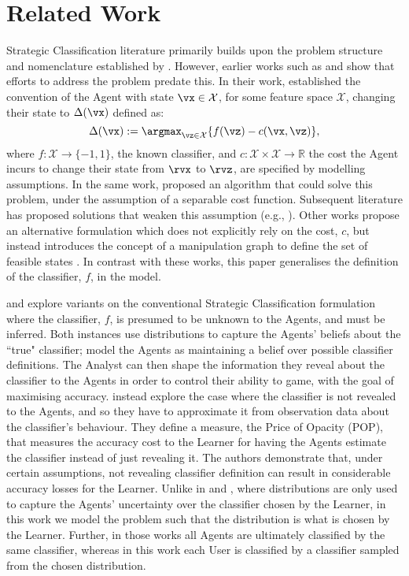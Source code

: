 \section{Related Work}
\label{related_work}
Strategic Classification literature primarily builds upon the problem structure and nomenclature established by \cite{hardt2016}. However, earlier works such as \cite{dalvi2004} and \cite{bruckner2011} show that efforts to address the problem predate this. In their work, \citeauthor{hardt2016} established the convention of the Agent with state $\vx \in \mathcal{X}$, for some feature space $\mathcal{X}$, changing their state to $\Delta(\vx)$ defined as:
\begin{equation*}
    \Delta(\vx) := \argmax_{\vz \in \mathcal{X}} \{f(\vz) - c(\vx,\vz)\},
\end{equation*}
where $f: \mathcal{X} \rightarrow \{-1,1\}$, the known classifier, and $c: \mathcal{X} \times \mathcal{X} \rightarrow \mathbb{R}$ the cost the Agent incurs to change their state from $\rvx$ to $\rvz$, are specified by modelling assumptions. In the same work, \citeauthor{hardt2016} proposed an algorithm that could solve this problem, under the assumption of a separable cost function. Subsequent literature has proposed solutions that weaken this assumption (e.g., \cite{miller2020, eilat2022}). Other works propose an alternative formulation which does not explicitly rely on the cost, $c$, but instead introduces the concept of a manipulation graph to define the set of feasible states \cite{zhang2021, lechner2022, lechner2023}. In contrast with these works, this paper generalises the definition of the classifier, $f$, in the model.

\cite{ghalme2021} and \cite{cohen2024} explore variants on the conventional Strategic Classification formulation where the classifier, $f$, is presumed to be unknown to the Agents, and must be inferred. Both instances use distributions to capture the Agents' beliefs about the ``true" classifier; \citeauthor{cohen2024} model the Agents as maintaining a belief over possible classifier definitions. The Analyst can then shape the information they reveal about the classifier to the Agents in order to control their ability to game, with the goal of maximising accuracy. \citeauthor{ghalme2021} instead explore the case where the classifier is not revealed to the Agents, and so they have to approximate it from observation data about the classifier's behaviour. They define a measure, the Price of Opacity (POP), that measures the accuracy cost to the Learner for having the Agents estimate the classifier instead of just revealing it. The authors demonstrate that, under certain assumptions, not revealing classifier definition can result in considerable accuracy losses for the Learner. Unlike in \cite{ghalme2021} and \cite{cohen2024}, where distributions are only used to capture the Agents' uncertainty over the classifier chosen by the Learner, in this work we model the problem such that the distribution is what is chosen by the Learner. Further, in those works all Agents are ultimately classified by the same classifier, whereas in this work each User is classified by a classifier sampled from the chosen distribution.

